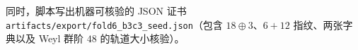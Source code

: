 




同时，脚本写出机器可核验的 JSON 证书 \texttt{artifacts/export/fold6\_b3c3\_seed.json}（包含 \(18\oplus 3\)、\(6+12\) 指纹、两张字典以及 Weyl 群阶 \(48\) 的轨道大小核验）。
